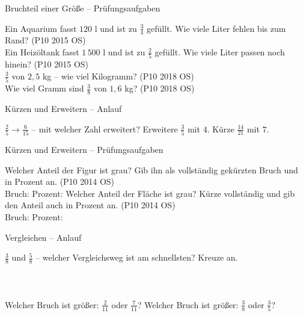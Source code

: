 \begin{aufgabe}{Bruchteil einer Größe – Prüfungsaufgaben}
\begin{teile}
\teil Ein Aquarium fasst $120$ l und ist zu $\frac{3}{4}$ gefüllt. Wie viele Liter fehlen bis zum Rand? \hfill (P10 2015 OS) \\ \leerfeld[l]
\teil Ein Heizöltank fasst $1\,500$ l und ist zu $\frac{2}{5}$ gefüllt. Wie viele Liter passen noch hinein? \hfill (P10 2015 OS) \\ \leerfeld[l]
\teil $\frac{3}{5}$ von $2{,}5$ kg – wie viel Kilogramm? \hfill (P10 2018 OS) \\ \leerfeld[kg]
\teil Wie viel Gramm sind $\frac{3}{8}$ von $1{,}6$ kg? \hfill (P10 2018 OS) \\ \leerfeld[g]
\end{teile}
\end{aufgabe}

\begin{aufgabe}{Kürzen und Erweitern – Anlauf}
\begin{teile}
\teil $\frac{2}{5} \to \frac{6}{15}$ – mit welcher Zahl erweitert?
\teil Erweitere $\frac{3}{5}$ mit $4$.
\teil Kürze $\frac{14}{21}$ mit $7$.
\end{teile}
\end{aufgabe}

\begin{aufgabe}{Kürzen und Erweitern – Prüfungsaufgaben}
\begin{teile}
\teil Welcher Anteil der Figur ist grau? Gib ihn als vollständig gekürzten Bruch und in Prozent an. \hfill (P10 2014 OS) \\

Bruch: \leerfeld Prozent: \leerfeld[\%]
\teil Welcher Anteil der Fläche ist grau? Kürze vollständig und gib den Anteil auch in Prozent an. \hfill (P10 2014 OS) \\

Bruch: \leerfeld Prozent: \leerfeld[\%]
\end{teile}
\end{aufgabe}

\begin{aufgabe}{Vergleichen – Anlauf}
\begin{teile}
\teil $\frac{3}{8}$ und $\frac{5}{8}$ – welcher Vergleichsweg ist am schnellsten? Kreuze an.\\ \\ \\ \\ 
\teil Welcher Bruch ist größer: $\frac{2}{11}$ oder $\frac{7}{11}$? \leerfeld
\teil Welcher Bruch ist größer: $\frac{3}{8}$ oder $\frac{3}{5}$? \leerfeld
\end{teile}
\end{aufgabe}

